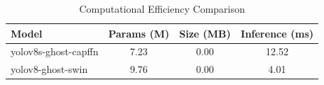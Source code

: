 
\begin{table}[htbp]
\centering
\caption{Computational Efficiency Comparison}
\label{tab:efficiency}
\begin{tabular}{lccc}
\toprule
\textbf{Model} & \textbf{Params (M)} & \textbf{Size (MB)} & \textbf{Inference (ms)} \\
\midrule
yolov8s-ghost-capffn & 7.23 & 0.00 & 12.52 \\
yolov8-ghost-swin & 9.76 & 0.00 & 4.01 \\

\bottomrule
\end{tabular}
\end{table}
